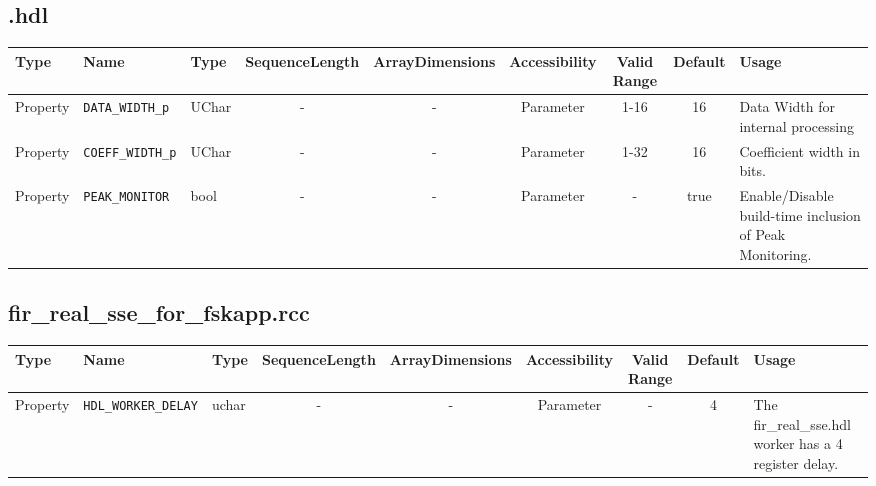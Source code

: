 \begin{landscape}
	\subsection*{\comp.hdl}
	\begin{scriptsize}
		\begin{tabular}{|p{3cm}|p{2cm}|p{1cm}|c|c|c|c|c|p{5cm}|}
			\hline
			\rowcolor{blue}
			Type     & Name                 & Type  & SequenceLength & ArrayDimensions & Accessibility       & Valid Range & Default & Usage                                        \\
			\hline
			Property & \verb+DATA_WIDTH_p+  & UChar & -              & -               & Parameter & 1-16        & 16      & Data Width for internal processing \\
			\hline
			Property & \verb+COEFF_WIDTH_p+ & UChar & -              & -               & Parameter & 1-32        & 16      & Coefficient width in bits.                           \\
			\hline
			Property & \verb+PEAK_MONITOR+ & bool & -              & -               & Parameter &  -       & true      & Enable/Disable build-time inclusion of Peak Monitoring.                            \\
			\hline
		\end{tabular}
	\end{scriptsize}
 
 \subsection*{fir\_real\_sse\_for\_fskapp.rcc}
	\begin{scriptsize}
		\begin{tabular}{|p{3cm}|p{2cm}|p{1cm}|c|c|c|c|c|p{5cm}|}
			\hline
			\rowcolor{blue}
			Type     & Name                 & Type  & SequenceLength & ArrayDimensions & Accessibility       & Valid Range & Default & Usage                                        \\
			\hline
			Property & \verb+HDL_WORKER_DELAY+  & uchar & -              & -               & Parameter &    -   & 4      & The fir\_real\_sse.hdl worker has a 4 register delay.\\
			\hline
		\end{tabular}
	\end{scriptsize}


\end{landscape}
